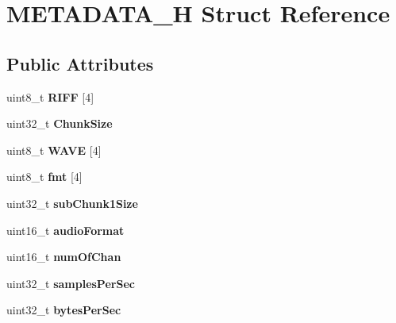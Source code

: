 \hypertarget{structMETADATA__H}{}\section{M\+E\+T\+A\+D\+A\+T\+A\+\_\+H Struct Reference}
\label{structMETADATA__H}
\subsection*{Public Attributes}
\begin{DoxyCompactItemize}
\item 
\mbox{\label{structMETADATA__H_a1cb225750dbcb07314066b40151f150b}} 
uint8\+\_\+t {\bfseries R\+I\+FF} \mbox{[}4\mbox{]}
\item 
\mbox{\label{structMETADATA__H_a12763a243ec62a16e9b132dfdc1c92d0}} 
uint32\+\_\+t {\bfseries Chunk\+Size}
\item 
\mbox{\label{structMETADATA__H_ac02e29d54561d399ed5f4bc556d73651}} 
uint8\+\_\+t {\bfseries W\+A\+VE} \mbox{[}4\mbox{]}
\item 
\mbox{\label{structMETADATA__H_ad490849b0c925425696abe2ca4ebc993}} 
uint8\+\_\+t {\bfseries fmt} \mbox{[}4\mbox{]}
\item 
\mbox{\label{structMETADATA__H_a7bc9d28dd1f674c49dcc00bababcfd96}} 
uint32\+\_\+t {\bfseries sub\+Chunk1\+Size}
\item 
\mbox{\label{structMETADATA__H_acf57628eeaa0ef02ca09823aaea893ba}} 
uint16\+\_\+t {\bfseries audio\+Format}
\item 
\mbox{\label{structMETADATA__H_a807e15f014dd692a7b0194f2fda8a6fc}} 
uint16\+\_\+t {\bfseries num\+Of\+Chan}
\item 
\mbox{\label{structMETADATA__H_a51e4647e9d95fa1e464dfc6b52e12633}} 
uint32\+\_\+t {\bfseries samples\+Per\+Sec}
\item 
\mbox{\label{structMETADATA__H_a5e2ed72b1e486bb6c6163143e02467ea}} 
uint32\+\_\+t {\bfseries bytes\+Per\+Sec}

\end{DoxyCompactItemize}
